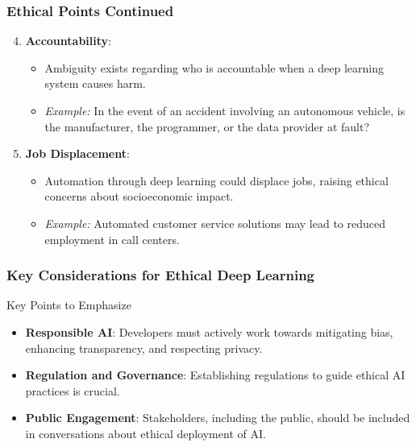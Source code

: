 \documentclass[aspectratio=169]{beamer}
\begin{document}
\begin{frame}[fragile]
    \frametitle{Ethical Points Continued}
    \begin{enumerate}
        \setcounter{enumi}{3} %
        \item \textbf{Accountability}:
            \begin{itemize}
                \item Ambiguity exists regarding who is accountable when a deep learning system causes harm.
                \item \textit{Example:} In the event of an accident involving an autonomous vehicle, is the manufacturer, the programmer, or the data provider at fault?
            \end{itemize}

        \item \textbf{Job Displacement}:
            \begin{itemize}
                \item Automation through deep learning could displace jobs, raising ethical concerns about socioeconomic impact.
                \item \textit{Example:} Automated customer service solutions may lead to reduced employment in call centers.
            \end{itemize}
    \end{enumerate}
\end{frame}

\begin{frame}[fragile]
    \frametitle{Key Considerations for Ethical Deep Learning}
    \begin{block}{Key Points to Emphasize}
        \begin{itemize}
            \item \textbf{Responsible AI}: Developers must actively work towards mitigating bias, enhancing transparency, and respecting privacy.
            \item \textbf{Regulation and Governance}: Establishing regulations to guide ethical AI practices is crucial.
            \item \textbf{Public Engagement}: Stakeholders, including the public, should be included in conversations about ethical deployment of AI.
        \end{itemize}
    \end{block}
\end{frame}
\end{document}
